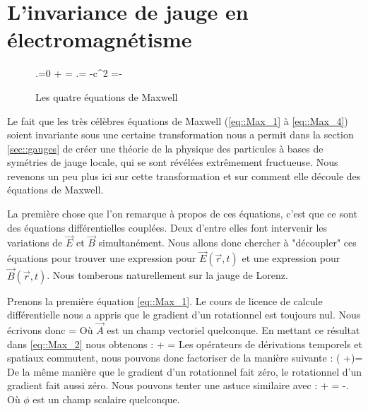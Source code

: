 \section{L'invariance de jauge en électromagnétisme}\label{sec::EM_classique}

\begin{wrapfigure}{r}{0.5\textwidth}
    \be\label{eq::Max_1}
        \Vec{\nabla}.=0  
    \ee 
    \be\label{eq::Max_2} 
         + \Vec{\nabla}\times {}= 
    \ee 
    \be\label{eq::Max_3}
        \Vec{\nabla}.= 
    \ee
    \be\label{eq::Max_4}
        -c^2 \Vec{\nabla}\times {} =- 
    \ee
    \caption{Les quatre équations de Maxwell}
\end{wrapfigure}

Le fait que les très célèbres équations de Maxwell (\eqref{eq::Max_1} à \eqref{eq::Max_4}) soient invariante sous une certaine transformation nous a permit dans la section \ref{sec::gauges} de créer une théorie de la physique des particules à bases de symétries de jauge locale, qui se sont révélées extrêmement fructueuse. Nous revenons un peu plus ici sur cette transformation et sur comment elle découle des équations de Maxwell.

La première chose que l'on remarque à propos de ces équations, c'est que ce sont des équations différentielles couplées. Deux d'entre elles font intervenir les variations de $\Vec{E}$ et $\Vec{B}$ simultanément. Nous allons donc chercher à "découpler" ces équations pour trouver une expression pour $\Vec{E}(\Vec{r},t)$ et une expression pour $\Vec{B}(\Vec{r},t)$. Nous tomberons naturellement sur la jauge de Lorenz. 

Prenons la première équation \eqref{eq::Max_1}. Le cours de licence de calcule différentielle nous a appris que le gradient d'un rotationnel est toujours nul. Nous écrivons donc 
\be \label{eq::B}
    =\Vec{\nabla}\times {}
\ee
Où $\Vec{A}$ est un champ vectoriel quelconque. En mettant ce résultat dans \eqref{eq::Max_2} nous obtenons : 
\be\nonumber
     + \Vec{\nabla}\times {}=
\ee 
Les opérateurs de dérivations temporels et spatiaux commutent, nous pouvons donc factoriser de la manière suivante : 
\be
    \Vec{\nabla}\times \left( +\right)=
\ee 
De la même manière que le gradient d'un rotationnel fait zéro, le rotationnel d'un gradient fait aussi zéro. Nous pouvons tenter une astuce similaire avec :
\be \label{eq::E}
     + = -\Vec{\nabla}.\phi
\ee 
Où $\phi$ est un champ scalaire quelconque.

